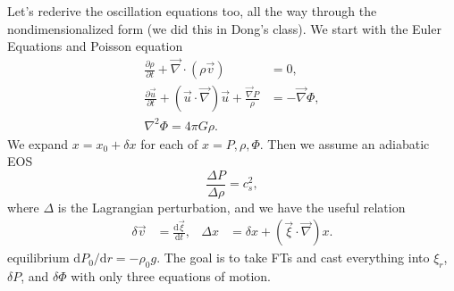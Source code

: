 \documentclass[11pt,
        usenames, %
        twocolumn,
        landscape,
        dvipsnames %
    ]{article}
\newcommand*{\rd}[2]{\frac{\mathrm{d}#1}{\mathrm{d}#2}}
\newcommand*{\pd}[2]{\frac{\partial#1}{\partial#2}}
\newcommand*{\rdil}[2]{\mathrm{d}#1 / \mathrm{d}#2}
\newcommand*{\p}[1]{\left(#1\right)}
\begin{document}
Let's rederive the oscillation equations too, all the way through the
nondimensionalized form (we did this in Dong's class). We start with the Euler
Equations and Poisson equation
\begin{align}
    \pd{\rho}{t} + \vec{\nabla} \cdot \p{\rho \vec{v}} &= 0,\\
    \pd{\vec{u}}{t} + \p{\vec{u} \cdot \vec{\nabla}}\vec{u}
        + \frac{\vec{\nabla}P}{\rho} &= -\vec{\nabla} \Phi,\\
    \nabla^2 \Phi = 4\pi G\rho.
\end{align}
We expand $x = x_0 + \delta x$ for each of $x = P, \rho, \Phi$. Then we assume
an adiabatic EOS
\begin{equation}
    \frac{\Delta P}{\Delta \rho} = c_s^2,
\end{equation}
where $\Delta$ is the Lagrangian perturbation, and we have the useful relation
\begin{align}
    \delta \vec{v} &= \rd{\vec{\xi}}{t}, &
    \Delta x &= \delta x + \p{\vec{\xi} \cdot \vec{\nabla}}x.
\end{align}
equilibrium $\rdil{P_0}{r} = -\rho_0 g$. The goal is to take FTs and cast
everything into $\xi_r$, $\delta P$, and $\delta \Phi$ with only three equations
of motion.
\end{document}
